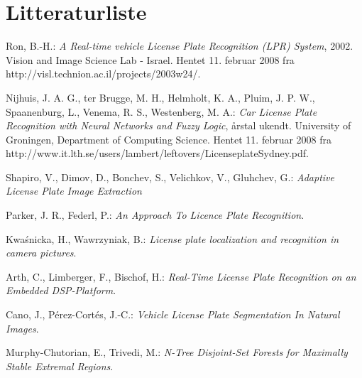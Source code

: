 \documentclass[11pt,a4paper,final]{article}
\begin{document}
\newpage %
\section{Litteraturliste}

\begin{thebibliography}{99}
%

 Ron, B.-H.: \textit{A Real-time vehicle License Plate Recognition (LPR) System}, 2002. Vision and Image Science Lab - Israel. Hentet 11. februar 2008 fra http://visl.technion.ac.il/projects/2003w24/.

 Nijhuis, J. A. G., ter Brugge, M. H., Helmholt, K. A., Pluim, J. P. W., Spaanenburg, L., Venema, R. S., Westenberg, M. A.: \textit{Car License Plate Recognition with Neural Networks and Fuzzy Logic}, årstal ukendt. University of Groningen, Department of Computing Science. Hentet 11. februar 2008 fra http://www.it.lth.se/users/lambert/leftovers/LicenseplateSydney.pdf.

 Shapiro, V., Dimov, D., Bonchev, S., Velichkov, V., Gluhchev, G.: \textit{Adaptive License Plate Image Extraction}

 Parker, J. R., Federl, P.: \textit{An Approach To Licence Plate Recognition}.

 Kwa\'snicka, H., Wawrzyniak, B.: \textit{License plate localization and recognition in camera pictures}.

 Arth, C., Limberger, F., Bischof, H.: \textit{Real-Time License Plate Recognition on an Embedded DSP-Platform}.

 Cano, J., Pérez-Cortés, J.-C.: \textit{Vehicle License Plate Segmentation In Natural Images}.







 Murphy-Chutorian, E., Trivedi, M.: \textit{N-Tree Disjoint-Set Forests for Maximally Stable Extremal Regions}.


\end{thebibliography}
\end{document}
